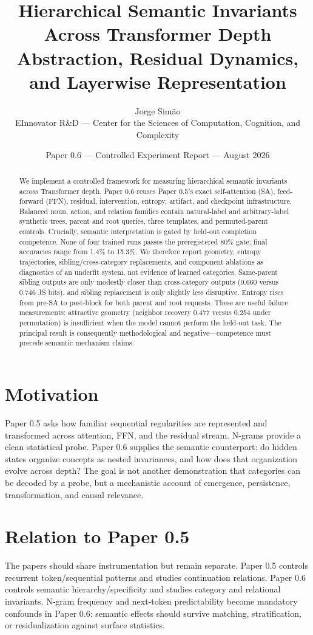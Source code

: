 \documentclass[11pt]{article}
\title{Hierarchical Semantic Invariants Across Transformer Depth\\\large Abstraction, Residual Dynamics, and Layerwise Representation}
\author{Jorge Sim\~ao\\EInnovator R\&D --- Center for the Sciences of Computation, Cognition, and Complexity}
\date{Paper 0.6 --- Controlled Experiment Report --- August 2026}
\begin{document}
\maketitle
\begin{abstract}
We implement a controlled framework for measuring hierarchical semantic invariants across Transformer depth. Paper 0.6 reuses Paper 0.5's exact self-attention (SA), feed-forward (FFN), residual, intervention, entropy, artifact, and checkpoint infrastructure. Balanced noun, action, and relation families contain natural-label and arbitrary-label synthetic trees, parent and root queries, three templates, and permuted-parent controls. Crucially, semantic interpretation is gated by held-out completion competence. None of four trained runs passes the preregistered 80\% gate: final accuracies range from 1.4\% to 15.3\%. We therefore report geometry, entropy trajectories, sibling/cross-category replacements, and component ablations as diagnostics of an underfit system, not evidence of learned categories. Same-parent sibling outputs are only modestly closer than cross-category outputs (0.660 versus 0.746 JS bits), and sibling replacement is only slightly less disruptive. Entropy rises from pre-SA to post-block for both parent and root requests. These are useful failure measurements: attractive geometry (neighbor recovery 0.477 versus 0.254 under permutation) is insufficient when the model cannot perform the held-out task. The principal result is consequently methodological and negative---competence must precede semantic mechanism claims.
\end{abstract}

\section{Motivation}
Paper 0.5 asks how familiar sequential regularities are represented and transformed across attention, FFN, and the residual stream. N-grams provide a clean statistical probe. Paper 0.6 supplies the semantic counterpart: do hidden states organize concepts as nested invariances, and how does that organization evolve across depth? The goal is not another demonstration that categories can be decoded by a probe, but a mechanistic account of emergence, persistence, transformation, and causal relevance.

\section{Relation to Paper 0.5}
The papers should share instrumentation but remain separate. Paper 0.5 controls recurrent token/sequential patterns and studies continuation relations. Paper 0.6 controls semantic hierarchy/specificity and studies category and relational invariants. N-gram frequency and next-token predictability become mandatory confounds in Paper 0.6: semantic effects should survive matching, stratification, or residualization against surface statistics.
\end{document}
